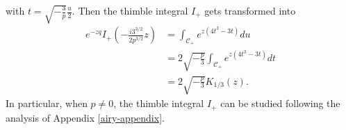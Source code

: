 \documentclass{article}
\newcommand{\laplace}{\mathcal{L}}
\theoremstyle{definition}
\theoremstyle{plain}
\newtheorem{lemma}[definition]{Lemma}
\begin{document}
with $t= \sqrt{-\frac{3}{p}} \frac{u}{2}$. Then the thimble integral $I_+$ gets transformed into 
\begin{align*}
    e^{-zq} I_+\left(-\tfrac{i 3^{3/2}}{2 p^{3/2}} z\right)&= \int_{\mathcal{C}_+} e^{z (4t^3-3t)} du\\
    &= 2\sqrt{-\tfrac{p}{3}} \int_{\mathcal{C}_+} e^{z (4t^3-3t)} dt \\
    &= 2\sqrt{-\tfrac{p}{3}} K_{1/3}(z). 
\end{align*}
In particular, when $p\neq 0$, the thimble integral $I_+$ can be studied following the analysis of Appendix \ref{airy-appendix}. 



\end{document}

